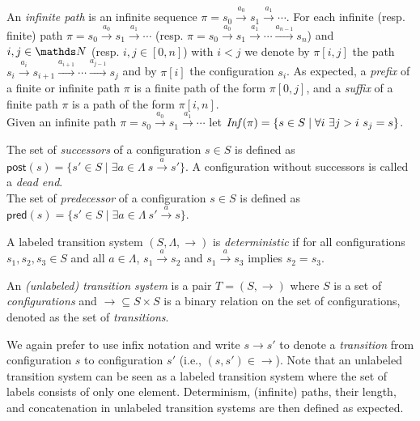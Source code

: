 An {\em infinite path} is an infinite sequence
 $\pi = s_0 \xrightarrow{a_0 } s_1 \xrightarrow{a_1 } \cdots $.
For each infinite (resp. finite) path  $\pi = s_0 \xrightarrow{a_0 } s_1 \xrightarrow{a_1 } \cdots$ 
(resp. $\pi = s_0 \xrightarrow{a_0 } s_1 \xrightarrow{a_1 } \cdots \xrightarrow{a_{n-1}} s_n$)
and $i,j \in \N$ (resp. $i,j \in [0,n]$) with $i<j$ we denote
by $\pi[i,j]$ the path 
$s_i  \xrightarrow{a_i } s_{i+1}  \xrightarrow{a_{i+1} } \cdots  \xrightarrow{a_{j-1} } s_j$
 and by $\pi[i]$ the configuration $s_i$.
As expected, a {\em prefix} of a finite or infinite path $\pi$ is a finite path of the form $\pi[0,j]$, and
a  {\em suffix} of a finite path $\pi$ is a path of the form $\pi[i,n]$.  \\
Given an infinite path $\pi = s_0 \xrightarrow{a_0 } s_1 \xrightarrow{a_1 } \cdots$ let
$\text{\textit{Inf}}(\pi) = \{ s \in S \mid \forall i ~ \exists j > i ~ s_j = s\}$.

\newcommand{\pred}{\textsf{pred}}
\newcommand{\post}{\textsf{post}}


\noindent
The set of {\em successors} of a configuration $s \in S$ is deﬁned as
$\post(s) = \{ s' \in S \mid \exists a \in \Lambda ~ s \xrightarrow{a} s'\}$.
A configuration without successors is called a {\em dead end}.  \\
The set of {\em predecessor} of a configuration $s \in S$ is deﬁned as
$\pred(s) = \{ s' \in S \mid \exists a \in \Lambda ~ s' \xrightarrow{a} s\}$.



A labeled transition system $(S, \Lambda, \rightarrow)$ is {\em deterministic} if for all configurations $s_1, s_2, s_3 \in S$ and all
$a \in \Lambda$,
 $ s_1  \xrightarrow{a} s_{2}$ and  
 $s_1  \xrightarrow{a} s_{3} $ implies $s_2 = s_3 $. \\



\begin{definition}
An {\em (unlabeled) transition system} is a pair $T = (S,\rightarrow )$ where $S$ is a set of 
{\em configurations} and  
$ {\rightarrow} \subseteq S \times S$ is a
binary relation 
on
the set of configurations, denoted as the set of {\em transitions}. 
\end{definition}

We again prefer to use infix notation and write $s \rightarrow s'$ to denote a {\em transition} from configuration $s$ to configuration $s'$ (i.e., $ (s,s') \in  {\rightarrow} $). \newline
Note 
 that an unlabeled transition system can be seen as a labeled transition system where the set of labels consists of only one element. 
Determinism, (infinite) paths, their length, and concatenation in unlabeled transition systems are
then defined as expected.

